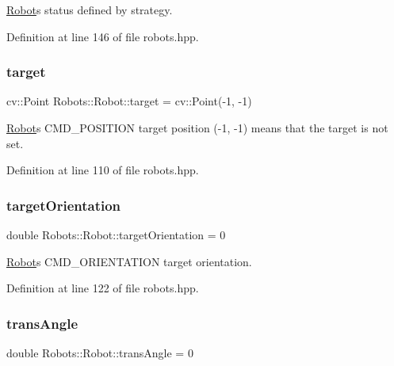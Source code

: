 \hyperlink{struct_robots_1_1_robot}{Robot}\textquotesingle{}s status defined by strategy. 



Definition at line 146 of file robots.\+hpp.

\mbox{\label{struct_robots_1_1_robot_a71780fa2401e52712b9bdc1699275063}} 
\subsubsection{\texorpdfstring{target}{target}}
{\footnotesize\ttfamily cv\+::\+Point Robots\+::\+Robot\+::target = cv\+::\+Point(-\/1, -\/1)}

\hyperlink{struct_robots_1_1_robot}{Robot}\textquotesingle{}s C\+M\+D\+\_\+\+P\+O\+S\+I\+T\+I\+ON target position (-\/1, -\/1) means that the target is not set. 

Definition at line 110 of file robots.\+hpp.

\mbox{\label{struct_robots_1_1_robot_a6f2debee501324c946adf01dfddec728}} 
\subsubsection{\texorpdfstring{target\+Orientation}{targetOrientation}}
{\footnotesize\ttfamily double Robots\+::\+Robot\+::target\+Orientation = 0}



\hyperlink{struct_robots_1_1_robot}{Robot}\textquotesingle{}s C\+M\+D\+\_\+\+O\+R\+I\+E\+N\+T\+A\+T\+I\+ON target orientation. 



Definition at line 122 of file robots.\+hpp.

\mbox{\label{struct_robots_1_1_robot_a7be046467fb2c4ad455c5394667be2ad}} 
\subsubsection{\texorpdfstring{trans\+Angle}{transAngle}}
{\footnotesize\ttfamily double Robots\+::\+Robot\+::trans\+Angle = 0}



